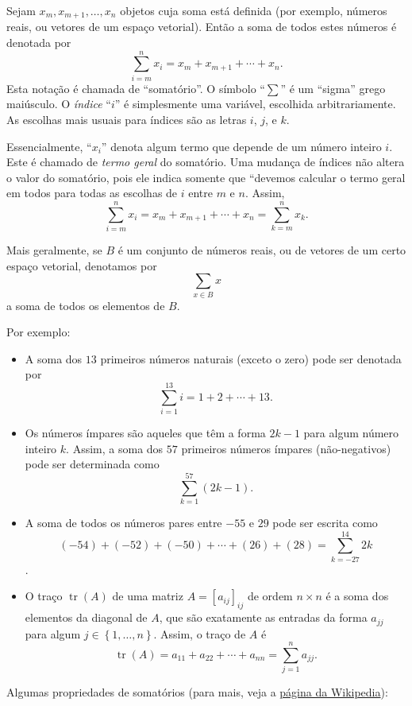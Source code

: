 Sejam $x_m,x_{m+1},\ldots,x_n$ objetos cuja soma está definida (por exemplo, números reais, ou vetores de um espaço vetorial). Então a soma de todos estes números é denotada por
\[\sum_{i=m}^n x_i=x_m+x_{m+1}+\cdots+x_n.\]
Esta notação é chamada de ``somatório''. O símbolo ``$\sum$'' é um ``sigma'' grego maiúsculo. O \textit{índice} ``$i$'' é simplesmente uma variável, escolhida arbitrariamente. As escolhas mais usuais para índices são as letras $i$, $j$, e $k$.

Essencialmente, ``$x_i$'' denota algum termo que depende de um número inteiro $i$. Este é chamado de \textit{termo geral} do somatório. Uma mudança de índices não altera o valor do somatório, pois ele indica somente que ``devemos calcular o termo geral em todos para todas as escolhas de $i$ entre $m$ e $n$. Assim,
\[\sum_{i=m}^n x_i=x_m+x_{m+1}+\cdots+x_n=\sum_{k=m}^n x_k.\]

Mais geralmente, se $B$ é um conjunto de números reais, ou de vetores de um certo espaço vetorial, denotamos por
\[\sum_{x\in B} x\]
a soma de todos os elementos de $B$.

Por exemplo:
\begin{itemize}
	\item A soma dos $13$ primeiros números naturais (exceto o zero) pode ser denotada por
		\[\sum_{i=1}^13 i=1+2+\cdots+13.\]
	\item Os números ímpares são aqueles que têm a forma $2k-1$ para algum número inteiro $k$. Assim, a soma dos $57$ primeiros números ímpares (não-negativos) pode ser determinada como
		\[\sum_{k=1}^{57}(2k-1).\]
	\item A soma de todos os números pares entre $-55$ e $29$ pode ser escrita como
	\[(-54)+(-52)+(-50)+\cdots+(26)+(28)=\sum_{k=-27}^{14} 2k\].
	\item O traço $\operatorname{tr}(A)$ de uma matriz $A=[a_{ij}]_{ij}$ de ordem $n\times n$ é a soma dos elementos da diagonal de $A$, que são exatamente as entradas da forma $a_{jj}$ para algum $j\in\left\{1,\ldots,n\right\}$. Assim, o traço de $A$ é
	\[\operatorname{tr}(A)=a_{11}+a_{22}+\cdots+a_{nn}=\sum_{j=1}^n a_{jj}.\]
\end{itemize}

Algumas propriedades de somatórios (para mais, veja a \href{https://pt.wikipedia.org/wiki/Somatório}{página da Wikipedia}):

